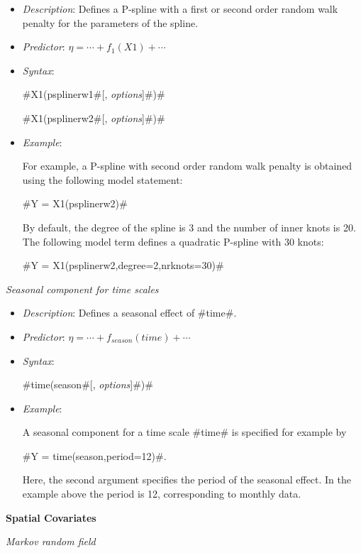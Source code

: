 \begin{itemize}
\item[] {\em Description}: Defines a P-spline with a first or second order random walk penalty for
the parameters of the spline.
\item[] {\em Predictor}: $\eta =  \cdots + f_1(X1) + \cdots$
\item[] {\em Syntax}:

#X1(psplinerw1#[, {\em options}]#)#

#X1(psplinerw2#[, {\em options}]#)#
\item[] {\em Example}:

For example, a P-spline with second order random walk penalty is
obtained using the following model statement:

#Y = X1(psplinerw2)#

By default, the degree of the spline is 3 and the number of inner
knots is 20. The following model term defines a quadratic P-spline
with 30 knots:

#Y = X1(psplinerw2,degree=2,nrknots=30)#
\end{itemize}

{\em Seasonal component for time scales}

\begin{itemize}
\item[] {\em Description}: Defines a seasonal effect of #time#.
\item[] {\em Predictor}: $\eta =  \cdots + f_{season}(time) + \cdots $
\item[] {\em Syntax}:

#time(season#[, {\em options}]#)#
\item[] {\em Example}:

A seasonal component for a time scale #time# is specified for
example by

#Y = time(season,period=12)#.

Here, the second argument specifies the period of the seasonal
effect. In the example above the period is 12, corresponding to
monthly data.
\end{itemize}


{\bf Spatial Covariates}
\medskip

{\em Markov random field}


